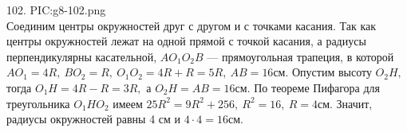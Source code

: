 102. {{PIC:g8-102.png}}\\
Соединим центры окружностей друг с другом и с точками касания. Так как центры окружностей лежат на одной прямой с точкой касания, а радиусы перпендикулярны касательной, $AO_1O_2B$ --- прямоугольная трапеция, в которой $AO_1=4R,\ BO_2=R,\ O_1O_2=4R+R=5R,\ AB=16$см. Опустим высоту $O_2H,$ тогда $O_1H=4R-R=3R,$ а $O_2H=AB=16$см. По теореме Пифагора для треугольника $O_1HO_2$ имеем $25R^2=9R^2+256,\ R^2=16,\ R=4$см. Значит, радиусы окружностей равны 4 см и $4\cdot4=16$см.\\
